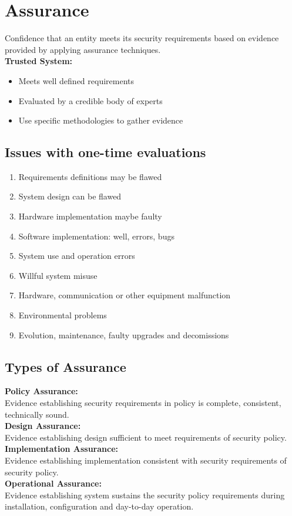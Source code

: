 
\section{Assurance}
Confidence that an entity meets its security requirements based on evidence provided by applying assurance techniques.\\
\textbf{Trusted System:}
\begin{itemize}
    \item Meets well defined requirements
    \item Evaluated by a credible body of experts
    \item Use specific methodologies to gather evidence
\end{itemize}

\subsection{Issues with one-time evaluations}
\begin{enumerate}
    \item Requirements definitions may be flawed
    \item System design can be flawed
    \item Hardware implementation maybe faulty
    \item Software implementation: well, errors, bugs
    \item System use and operation errors
    \item Willful system misuse
    \item Hardware, communication or other equipment malfunction
    \item Environmental problems
    \item Evolution, maintenance, faulty upgrades and decomissions
\end{enumerate}

\subsection{Types of Assurance}
\textbf{Policy Assurance:}\\
Evidence establishing security requirements in policy is complete, consistent, technically sound.\\
\textbf{Design Assurance:}\\
Evidence establishing design sufficient to meet requirements of security policy.\\
\textbf{Implementation Assurance:}\\
Evidence establishing implementation consistent with security requirements of security policy.\\
\textbf{Operational Assurance:}\\
Evidence establishing system sustains the security policy requirements during installation, configuration and day-to-day operation.

